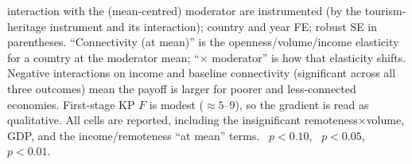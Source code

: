 \begin{table}[t]
\begin{threeparttable}
\begin{tablenotes}
interaction with the (mean-centred) moderator are instrumented (by the
tourism-heritage instrument and its interaction); country and year FE; robust
SE in parentheses. ``Connectivity (at mean)'' is the openness/volume/income
elasticity for a country at the moderator mean; ``$\times$ moderator'' is how
that elasticity shifts. Negative interactions on income and baseline
connectivity (significant across all three outcomes) mean the payoff is larger
for poorer and less-connected economies. First-stage KP $F$ is modest
($\approx 5$--$9$), so the gradient is read as qualitative. All cells are
reported, including the insignificant remoteness$\times$volume, GDP, and the
income/remoteness ``at mean'' terms. \sym{*}~$p<0.10$, \sym{**}~$p<0.05$,
\sym{***}~$p<0.01$.
\end{tablenotes}
\end{threeparttable}
\end{table}
